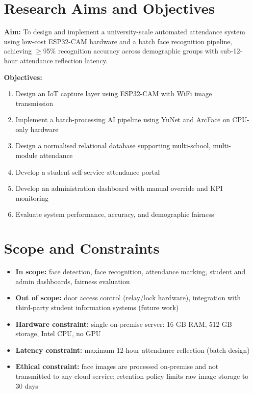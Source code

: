 \documentclass[12pt,a4paper]{report}
\begin{document}
\section{Research Aims and Objectives}
\textbf{Aim:} To design and implement a university-scale automated attendance system using low-cost ESP32-CAM hardware and a batch face recognition pipeline, achieving $\geq$95\% recognition accuracy across demographic groups with sub-12-hour attendance reflection latency.

\textbf{Objectives:}
\begin{enumerate}
  \item Design an IoT capture layer using ESP32-CAM with WiFi image transmission
  \item Implement a batch-processing AI pipeline using YuNet and ArcFace on CPU-only hardware
  \item Design a normalised relational database supporting multi-school, multi-module attendance
  \item Develop a student self-service attendance portal
  \item Develop an administration dashboard with manual override and KPI monitoring
  \item Evaluate system performance, accuracy, and demographic fairness
\end{enumerate}

\section{Scope and Constraints}
\begin{itemize}
  \item \textbf{In scope:} face detection, face recognition, attendance marking, student and admin dashboards, fairness evaluation
  \item \textbf{Out of scope:} door access control (relay/lock hardware), integration with third-party student information systems (future work)
  \item \textbf{Hardware constraint:} single on-premise server: 16 GB RAM, 512 GB storage, Intel CPU, no GPU
  \item \textbf{Latency constraint:} maximum 12-hour attendance reflection (batch design)
  \item \textbf{Ethical constraint:} face images are processed on-premise and not transmitted to any cloud service; retention policy limits raw image storage to 30 days
\end{itemize}
\end{document}
